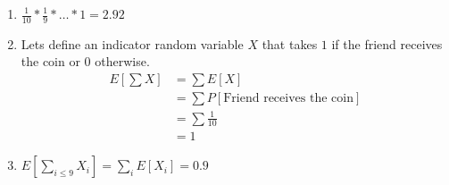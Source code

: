 \documentclass[12pt, a4paper]{article}
\begin{document}
\begin{enumerate}
    \item $\frac{1}{10}*\frac{1}{9}*\dots*1 = 2.92$
    \item Lets define an indicator random variable $X$ that takes $1$ if the friend receives the coin or $0$ otherwise. 
    \begin{subequations}
      \begin{align}
        E[\sum X] &= \sum E[X]\\
        &= \sum P[\text{Friend receives the coin}]\\
        &= \sum \frac{1}{10}\\
        &= 1
      \end{align}
    \end{subequations}
    \item $E[\sum_{i\leq 9} X_i]=\sum_i E[X_i]=0.9$
  \end{enumerate}
\end{document}
